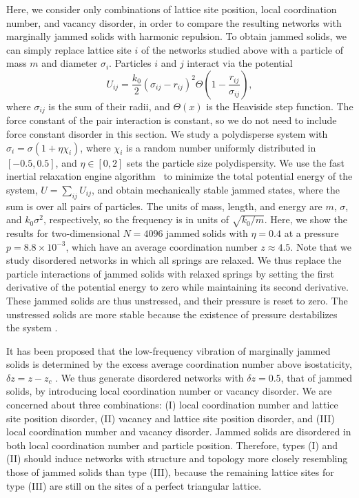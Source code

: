 \documentclass[twocolumn,printnumbers,amsmath,amssymb,prl,verbatim]{revtex4}
\begin{document}
Here, we consider only combinations of lattice site position, local coordination number, and vacancy disorder, in order to compare the resulting networks with marginally jammed solids with harmonic repulsion. To obtain jammed solids, we can simply replace lattice site $i$ of the networks studied above with a particle of mass $m$ and diameter $\sigma_i$. Particles $i$ and $j$ interact via the potential
\begin{equation}
U_{ij}=\frac{k_0}{2}\left( \sigma_{ij}-r_{ij} \right)^{2}\Theta\left(1-\frac{r_{ij}}{\sigma_{ij}}\right), \label{eq:hertzian}
\end{equation}
where $\sigma_{ij}$ is the sum of their radii, and $\Theta(x)$ is the Heaviside step function. The force constant of the pair interaction is constant, so we do not need to include force constant disorder in this section. We study a polydisperse system with $\sigma_i=\sigma(1+\eta \chi_i)$, where $\chi_i$ is a random number uniformly distributed in $[-0.5, 0.5]$, and $\eta\in [0, 2]$ sets the particle size polydispersity. We use the fast inertial relaxation engine algorithm~\cite{fire} to minimize the total potential energy of the system, $U=\sum_{ij} U_{ij}$, and obtain mechanically stable jammed states, where the sum is over all pairs of particles. The units of mass, length, and energy are $m$, $\sigma$, and $k_0\sigma^2$, respectively, so the frequency is in units of $\sqrt{k_0/m}$. Here, we show the results for two-dimensional $N=4096$ jammed solids with $\eta=0.4$ at a pressure $p=8.8\times10^{-3}$, which have an average coordination number $z\approx 4.5$. Note that we study disordered networks in which all springs are relaxed. We thus replace the particle interactions of jammed solids with relaxed springs by setting the first derivative of the potential energy to zero while maintaining its second derivative. These jammed solids are thus unstressed, and their pressure is reset to zero. The unstressed solids are more stable because the existence of pressure destabilizes the system \cite{xu}.

It has been proposed that the low-frequency vibration of marginally jammed solids is determined by the excess average coordination number above isostaticity, $\delta z =z-z_c$ \cite{silbert,wyart}. We thus generate disordered networks with $\delta z=0.5$, that of jammed solids, by introducing local coordination number or vacancy disorder. We are concerned about three combinations: (I) local coordination number and lattice site position disorder, (II) vacancy and lattice site position disorder, and (III) local coordination number and vacancy disorder. Jammed solids are disordered in both local coordination number and particle position. Therefore, types (I) and (II) should induce networks with structure and topology more closely resembling those of jammed solids than type (III), because the remaining lattice sites for type (III) are still on the sites of a perfect triangular lattice.
\end{document}
